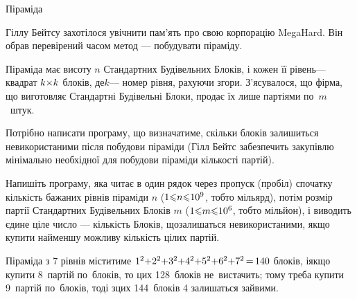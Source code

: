 \begin{problemAllDefault}{Піраміда}

Гіллу Бейтсу захотілося увічнити пам'ять про свою корпорацію MegaHard. Він обрав перевірений часом метод --- побудувати піраміду.

Піраміда має висоту $n$ Стандартних Будівельних Блоків, і кожен її рівень\nolinebreak[3] --- квадрат $k{\times}k$ блоків, де\nolinebreak[3] $k$\nolinebreak[3] --- номер рівня, рахуючи згори. З'ясувалося, що фірма, що виготовляє Стандартні Будівельні Блоки, продає їх лише партіями по~$m$~штук.

{

Потрібно написати програму, що визначатиме, скільки блоків залишиться не\nolinebreak[3] використаними після побудови піраміди (Гілл Бейтс забезпечить закупівлю мінімально необхідної для побудови піраміди кількості партій).

Напишіть програму, яка читає в один рядок через пропуск (пробіл) спочатку кількість бажаних рівнів піраміди $n$ ($1{\leqslant}n{\leqslant}10^9$, тобто мільярд), потім розмір партії Стандартних Будівельних Блоків $m$ ($1{\leqslant}m{\leqslant}10^6$, тобто мільйон), і виводить єдине ціле число --- кількість Блоків, що\nolinebreak[3] залишаться не\nolinebreak[3] використаними, якщо купити найменшу можливу кількість цілих партій.

}

\Example
\begin{exampleSimple}{4em}{4em}%
%
\end{exampleSimple}

\Note
Піраміда з 7 рівнів міститиме %
$1^2{+}2^2{+}3^2{+}4^2{+}5^2{+}6^2{+}7^2\dib{{=}}140$
блоків, і\nolinebreak[3] якщо купити 8~партій по~блоків, то цих 128~блоків не~вистачить; тому треба купити 9~партій по~блоків, тоді з\nolinebreak[3] цих 144~блоків 4 залишаться зайвими.


\end{problemAllDefault}
